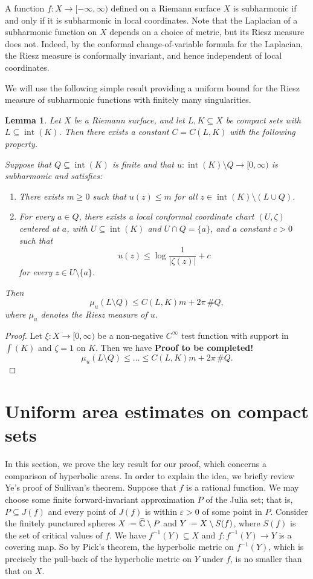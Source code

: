 \documentclass[12pt,a4paper,reqno]{amsart}
\theoremstyle{plain}
\newtheorem{lem}[thm]{Lemma}
\renewcommand{\subset}{\subseteq}
\theoremstyle{definition}
\theoremstyle{remark}
\newcommand{\eps}{\varepsilon}
\newcommand{\interior}{\operatorname{int}}
\numberwithin{equation}{section}
\newcommand \Ch{\widehat{\mathbb{C}}}
\newcommand*{\defeq}{\mathrel{\vcenter{\baselineskip0.5ex \lineskiplimit0pt
                     \hbox{\scriptsize.}\hbox{\scriptsize.}}}%
                     =}
\newcommand{\lr}[1]{{\color{magenta} #1}}
\begin{document}
\lr{A function $f\colon X\to[-\infty,\infty)$ defined on a Riemann surface $X$ is subharmonic
  if and only if it is subharmonic in local coordinates. Note that the Laplacian of
  a subharmonic function on $X$ depends on a choice of metric, but its Riesz measure
  does not. Indeed, by the conformal change-of-variable formula
  for the Laplacian, the Riesz measure is conformally invariant, and hence independent
  of local coordinates.

We will use the following simple result providing a uniform bound for 
 the Riesz measure of subharmonic functions with finitely many singularities.
\begin{lem}
    Let $X$ be a Riemann surface, and let $L,K \subset X$ be compact sets with $L \subset \interior(K)$. Then there exists a constant $C=C(L,K)$ with the following property.

    Suppose that $Q \subset \interior(K)$ is finite and that
    $u\colon \interior(K)\setminus Q \to [0,\infty)$ is subharmonic and satisfies:
    \begin{enumerate}[(1)]
        \item There exists $m \geq 0$ such that $u(z) \leq m$ for all $z \in \interior(K)\setminus (L\cup Q)$.
        \item For every $a \in Q$, there exists a local conformal coordinate chart $(U,\zeta)$ centered at $a$, with $U \subset \interior(K)$ and $U \cap Q = \{a\}$, and a constant $c>0$ such that
        \[
            u(z) \leq \log\frac{1}{|\zeta(z)|}+c
        \]
        for every $z \in U\setminus\{a\}$.
    \end{enumerate}
    Then
    \[
        \mu_u(L\setminus Q) \leq C(L,K)m + 2\pi\,\#Q,
    \]
    where $\mu_u$ denotes the Riesz measure of $u$.
\end{lem}
\begin{proof}
  Let $\xi\colon X\to [0,\infty)$ be a non-negative $C^{\infty}$ test function with support
   in $\int(K)$ and $\zeta = 1$ on $K$. Then we have \textbf{Proof to be completed!}
    \[ \mu_u(L\setminus Q) \leq \dots \leq C(L,K)m + 2\pi\,\#Q.\]
\end{proof}
}



\section{Uniform area estimates on compact sets}\label{sec:loss}%
In this section, we prove the key result for our proof, which concerns a comparison
of hyperbolic areas. In order to explain the idea, we briefly review Ye's proof of 
Sullivan's theorem. Suppose that $f$ is a rational function. We may choose some
finite forward-invariant approximation $P$ of the Julia set; that is, 
$P\subset J(f)$ and every point of $J(f)$ is within $\eps>0$ of some point in $P$. 
Consider the finitely punctured spheres $X\defeq \Ch\setminus P$ and
$Y\defeq X\setminus S(f)$, where $S(f)$ is the set of critical values of $f$. 
We have $f^{-1}(Y)\subset X$ and $f\colon f^{-1}(Y)\to Y$ is a covering map.
So by Pick's theorem, the hyperbolic metric on $f^{-1}(Y)$, which is precisely the pull-back 
of the hyperbolic metric on $Y$ under $f$, is no smaller than that on $X$. 
\end{document}
